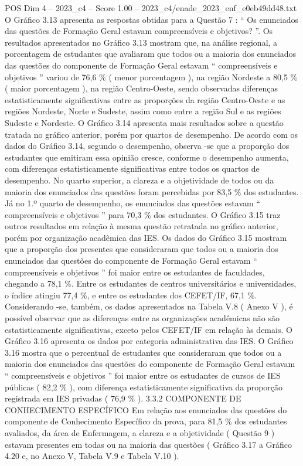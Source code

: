 \begin{textsample}{POS Dim 4 – 2023\_c4 – Score 1.00 – 2023\_c4/enade\_2023\_enf\_e0eb49dd48.txt}
O Gráfico 3.13 apresenta as respostas obtidas para a Questão 7 : “ Os enunciados das questões de Formação Geral estavam compreensíveis e objetivos? ”.
Os resultados apresentados no Gráfico 3.13 mostram que, na análise regional, a porcentagem de estudantes que avaliaram que todos ou a maioria dos enunciados das questões do componente de Formação Geral estavam “ compreensíveis e objetivos ” variou de 76,6 \% ( menor porcentagem ), na região Nordeste a 80,5 \% ( maior porcentagem ), na região Centro-Oeste, sendo observadas diferenças estatisticamente significativas entre as proporções da região Centro-Oeste e as regiões Nordeste, Norte e Sudeste, assim como entre a região Sul e as regiões Sudeste e Nordeste.
O Gráfico 3.14 apresenta mais resultados sobre a questão tratada no gráfico anterior, porém por quartos de desempenho.
De acordo com os dados do Gráfico 3.14, segundo o desempenho, observa -se que a proporção dos estudantes que emitiram essa opinião cresce, conforme o desempenho aumenta, com diferenças estatisticamente significativas entre todos os quartos de desempenho.
No quarto superior, a clareza e a objetividade de todos ou da maioria dos enunciados das questões foram percebidas por 83,5 \% dos estudantes.
Já no 1.º quarto de desempenho, os enunciados das questões estavam “ compreensíveis e objetivos ” para 70,3 \% dos estudantes.
O Gráfico 3.15 traz outros resultados em relação à mesma questão retratada no gráfico anterior, porém por organização acadêmica das IES.
Os dados do Gráfico 3.15 mostram que a proporção dos presentes que consideraram que todos ou a maioria dos enunciados das questões do componente de Formação Geral estavam “ compreensíveis e objetivos ” foi maior entre os estudantes de faculdades, chegando a 78,1 \%.
Entre os estudantes de centros universitários e universidades, o índice atingiu 77,4 \%, e entre os estudantes dos CEFET/IF, 67,1 \%.
Considerando -se, também, os dados apresentados na Tabela V.8 ( Anexo V ), é possível observar que as diferenças entre as organizações acadêmicas não são estatisticamente significativas, exceto pelos CEFET/IF em relação às demais.
O Gráfico 3.16 apresenta os dados por categoria administrativa das IES.
O Gráfico 3.16 mostra que o percentual de estudantes que consideraram que todos ou a maioria dos enunciados das questões do componente de Formação Geral estavam “ compreensíveis e objetivos ” foi maior entre os estudantes de cursos de IES públicas ( 82,2 \% ), com diferença estatisticamente significativa da proporção registrada em IES privadas ( 76,9 \% ). 3.3.2 COMPONENTE DE CONHECIMENTO ESPECÍFICO Em relação aos enunciados das questões do componente de Conhecimento Específico da prova, para 81,5 \% dos estudantes avaliados, da área de Enfermagem, a clareza e a objetividade ( Questão 9 ) estavam presentes em todas ou na maioria das questões ( Gráfico 3.17 a Gráfico 4.20 e, no Anexo V, Tabela V.9 e Tabela V.10 ).

\end{textsample}
